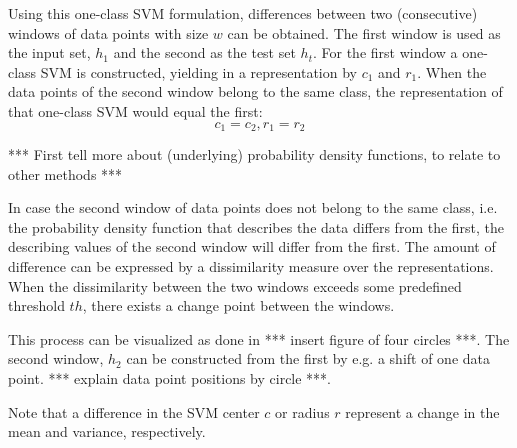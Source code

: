 Using this one-class SVM formulation, differences between two (consecutive) windows of data points with size $w$ can be obtained.
The first window is used as the input set, $h_1$ and the second as the test set $h_t$.
For the first window a one-class SVM is constructed, yielding in a representation by $c_1$ and $r_1$.
When the data points of the second window belong to the same class, the representation of that one-class SVM would equal the first:
\begin{equation}
  c_1 = c_2, r_1 = r_2
\end{equation}

*** First tell more about (underlying) probability density functions, to relate to other methods ***

In case the second window of data points does not belong to the same class, i.e. the probability density function that describes the data differs from the first, the describing values of the second window will differ from the first.
The amount of difference can be expressed by a dissimilarity measure over the representations.
When the dissimilarity between the two windows exceeds some predefined threshold $th$, there exists a change point between the windows.

This process can be visualized as done in *** insert figure of four circles ***. The second window, $h_2$ can be constructed from the first by e.g. a shift of one data point. *** explain data point positions by circle ***.

Note that a difference in the SVM center $c$ or radius $r$ represent a change in the mean and variance, respectively.

